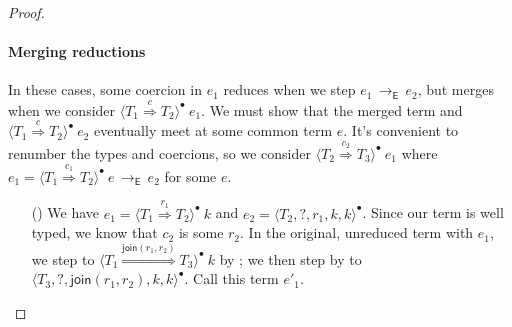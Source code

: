 \documentclass[9pt]{extarticle}
\newcommand{\ottnt}[1]{\mathit{#1}}
\newcommand{\ottsym}[1]{#1}
\begin{document}
\begin{lemma}
\begin{proof}
{\begin{itemize}
    \end{itemize}

    \paragraph{Merging reductions}
In these cases, some coercion in $\ottnt{e_{{\mathrm{1}}}}$ reduces when we step
    $\ottnt{e_{{\mathrm{1}}}} \,  \longrightarrow _{  \mathsf{E}  }  \, \ottnt{e_{{\mathrm{2}}}}$, but merges when we consider $ \langle  \ottnt{T_{{\mathrm{1}}}}  \mathord{ \overset{ \ottnt{c} }{\Rightarrow} }  \ottnt{T_{{\mathrm{2}}}}  \rangle^{\bullet} ~  \ottnt{e_{{\mathrm{1}}}} $. We must show that the merged term and $ \langle  \ottnt{T_{{\mathrm{1}}}}  \mathord{ \overset{ \ottnt{c} }{\Rightarrow} }  \ottnt{T_{{\mathrm{2}}}}  \rangle^{\bullet} ~  \ottnt{e_{{\mathrm{2}}}} $
    eventually meet at some common term $\ottnt{e}$.
It's convenient to renumber the types and coercions, so we
    consider $ \langle  \ottnt{T_{{\mathrm{2}}}}  \mathord{ \overset{ \ottnt{c_{{\mathrm{2}}}} }{\Rightarrow} }  \ottnt{T_{{\mathrm{3}}}}  \rangle^{\bullet} ~  \ottnt{e_{{\mathrm{1}}}} $ where $\ottnt{e_{{\mathrm{1}}}} =  \langle  \ottnt{T_{{\mathrm{1}}}}  \mathord{ \overset{ \ottnt{c_{{\mathrm{1}}}} }{\Rightarrow} }  \ottnt{T_{{\mathrm{2}}}}  \rangle^{\bullet} ~  \ottnt{e}  \,  \longrightarrow _{  \mathsf{E}  }  \, \ottnt{e_{{\mathrm{2}}}}$ for some $\ottnt{e}$.
\begin{itemize}
    \item[(\E{CoerceStack})] We have $\ottnt{e_{{\mathrm{1}}}}  \ottsym{=}   \langle  \ottnt{T_{{\mathrm{1}}}}  \mathord{ \overset{ \ottnt{r_{{\mathrm{1}}}} }{\Rightarrow} }  \ottnt{T_{{\mathrm{2}}}}  \rangle^{\bullet} ~  \ottnt{k} $ and
      $\ottnt{e_{{\mathrm{2}}}}  \ottsym{=}   \langle  \ottnt{T_{{\mathrm{2}}}} ,   \mathord{?}  ,  \ottnt{r_{{\mathrm{1}}}} ,  \ottnt{k} ,  \ottnt{k}  \rangle^{\bullet} $.
Since our term is well typed, we know that $\ottnt{c_{{\mathrm{2}}}}$ is some
      $\ottnt{r_{{\mathrm{2}}}}$.
In the original, unreduced term with $\ottnt{e_{{\mathrm{1}}}}$, we step to $ \langle  \ottnt{T_{{\mathrm{1}}}}  \mathord{ \overset{  \mathsf{join} ( \ottnt{r_{{\mathrm{1}}}} , \ottnt{r_{{\mathrm{2}}}} )  }{\Rightarrow} }  \ottnt{T_{{\mathrm{3}}}}  \rangle^{\bullet} ~  \ottnt{k} $ by \ECastMerge; we then step by
       to $ \langle  \ottnt{T_{{\mathrm{3}}}} ,   \mathord{?}  ,   \mathsf{join} ( \ottnt{r_{{\mathrm{1}}}} , \ottnt{r_{{\mathrm{2}}}} )  ,  \ottnt{k} ,  \ottnt{k}  \rangle^{\bullet} $. Call this term
      $\ottnt{e'_{{\mathrm{1}}}}$.


\end{itemize}}
\end{proof}
\end{lemma}
\end{document}
